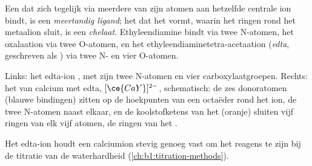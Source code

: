 \begin{definition}\label{def:b1:complexation:chelate}
Een  dat zich tegelijk via meerdere van zijn atomen aan hetzelfde
centrale ion bindt, is een \emph{meertandig ligand};
het  dat het vormt, waarin het  ringen rond het metaalion
sluit, is een \emph{chelaat}. Ethyleendiamine
 bindt via twee N-atomen, het oxalaation
 via twee O-atomen, en het ethyleendiaminetetra-acetaation
(\emph{edta}, geschreven als ) via twee N- en vier O-atomen.
\end{definition}

\begin{omfigure}
\hspace{2.2em}

{\small Links: het edta-ion , met zijn twee N-atomen en vier
carboxylaatgroepen. Rechts: het  van calcium met edta, $[\ce{CaY}]^{2-}$,
schematisch: de zes donoratomen (blauwe bindingen) zitten op de
hoekpunten van een octaëder rond het ion, de twee N-atomen naast elkaar,
en de koolstofketens van het  (oranje) sluiten vijf ringen van elk
vijf atomen, de ringen van het .}
\end{omfigure}

Het edta-ion houdt een calciumion stevig genoeg vast om het reagens te
zijn bij de titratie van de waterhardheid (\cref{ch:b1:titration-methods}).

